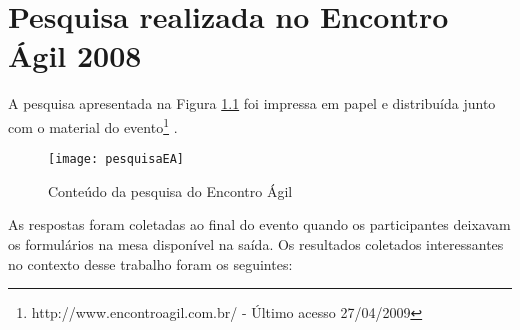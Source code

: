 \chapter{Pesquisa realizada no Encontro Ágil 2008}
\label{ape:EA}

A pesquisa apresentada na Figura \ref{fig:pesquisaEA} foi impressa em
papel e distribuída junto com o material do
evento\footnote{http://www.encontroagil.com.br/ - Último acesso
  27/04/2009} .

\begin{figure}[th]
  \centering
  \texttt{[image: pesquisaEA]}
  \caption{Conteúdo da pesquisa do Encontro Ágil}
  \label{fig:pesquisaEA}
\end{figure}

As respostas foram coletadas ao final do evento quando os
participantes deixavam os formulários na mesa disponível na saída. Os
resultados coletados interessantes no contexto desse trabalho foram os
seguintes:

